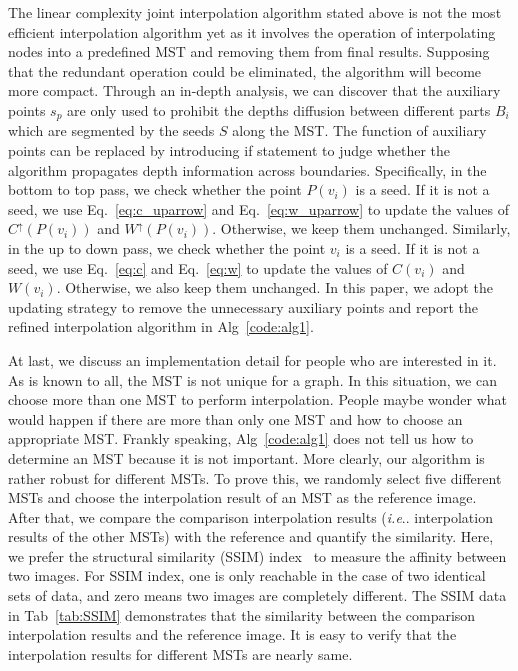 \documentclass[preprint,10pt,5p,times,twocolumn]{elsarticle}
\makeatletter
\DeclareRobustCommand\onedot{\futurelet\@let@token\@onedot}
\def\@onedot{\ifx\@let@token.\else.\null\fi\xspace}
\def\ie{\emph{i.e}\onedot} \def\Ie{\emph{I.e}\onedot}
\makeatother
\begin{document}
The linear complexity joint interpolation algorithm stated above is not the most efficient interpolation algorithm yet as it involves the operation of interpolating nodes into a predefined MST and removing them from final results. Supposing that the redundant operation could be eliminated, the algorithm will become more compact. Through an in-depth analysis, we can discover that the auxiliary points $s_p$ are only used to prohibit the depths diffusion between different parts $B_i$ which are segmented by the seeds $S$ along the MST. The function of auxiliary points can be replaced by introducing if statement to judge whether the algorithm propagates depth information across boundaries. Specifically, in the bottom to top pass, we check whether the point $P(v_i)$ is a seed. If it is not a seed, we use Eq.~\eqref{eq:c_uparrow} and Eq.~\eqref{eq:w_uparrow} to update the values of ${{C}^ \uparrow }(P(v_i))$ and ${{W}^ \uparrow }(P(v_i))$. Otherwise, we keep them unchanged. Similarly, in the up to down pass, we check whether the point $v_i$ is a seed. If it is not a seed, we use Eq.~\eqref{eq:c} and Eq.~\eqref{eq:w} to update the values of $C(v_i)$ and $W(v_i)$. Otherwise, we also keep them unchanged. In this paper, we adopt the updating strategy to remove the unnecessary auxiliary points and report the refined interpolation algorithm in Alg~\ref{code:alg1}.

At last, we discuss an implementation detail for people who are interested in it. As is known to all, the MST is not unique for a graph. In this situation, we can choose more than one MST to perform interpolation. People maybe wonder what would happen if there are more than only one MST and how to choose an appropriate MST. Frankly speaking, Alg~\ref{code:alg1} does not tell us how to determine an MST because it is not important. More clearly, our algorithm is rather robust for different MSTs. To prove this, we randomly select five different MSTs and choose the interpolation result of an MST as the reference image. After that, we compare the comparison interpolation results (\ie interpolation results of the other MSTs) with the reference and quantify the similarity. Here, we prefer the structural similarity (SSIM) index~\cite{Wang_TIP_2004} to measure the affinity between two images. For SSIM index, one is only reachable in the case of two identical sets of data, and zero means two images are completely different. The SSIM data in Tab~\ref{tab:SSIM} demonstrates that the similarity between the comparison interpolation results and the reference image. It is easy to verify that the interpolation results for different MSTs are nearly same.
\end{document}
